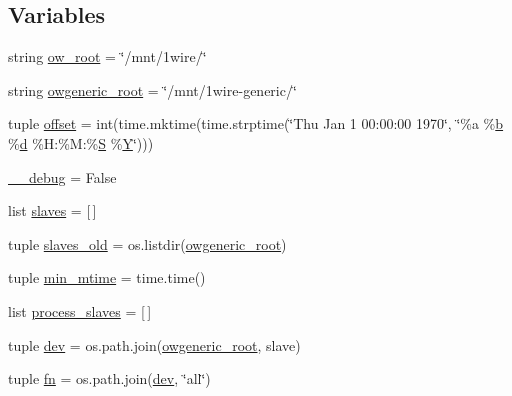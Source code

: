 \subsection*{Variables}
\begin{DoxyCompactItemize}
\item 
string \hyperlink{namespaceowgeneric__arduino_acf1b83c6bfca7dce8e079086078b19b9}{ow\-\_\-root} = \char`\"{}/mnt/1wire/\char`\"{}
\item 
string \hyperlink{namespaceowgeneric__arduino_a55174673236c57dac9b691a2f5b49b69}{owgeneric\-\_\-root} = \char`\"{}/mnt/1wire-\/generic/\char`\"{}
\item 
tuple \hyperlink{namespaceowgeneric__arduino_a30145d36e9de440b44c360e2c295e4aa}{offset} = int(time.\-mktime(time.\-strptime(\char`\"{}Thu Jan 1 00\-:00\-:00 1970\char`\"{}, \char`\"{}\%a \%\hyperlink{IMU_8cpp_a20f3a6e8a2ba2537edf801801628417b}{b} \%\hyperlink{OWGeneric__DangerShield_8ino_a22871ee78191bcd7676a38358795104e}{d} \%H\-:\%M\-:\%\hyperlink{md5_8c_a5a9675d71aad8449f8e4112ce611fd93}{S} \%\hyperlink{OWGeneric__SensorStation_8ino_ac915220fb659eb2c5958a1ccd81b80d4}{Y}\char`\"{})))
\item 
\hyperlink{namespaceowgeneric__arduino_abdc14696f564f9b8ed10fa1816940639}{\-\_\-\-\_\-debug} = False
\item 
list \hyperlink{namespaceowgeneric__arduino_a2c230abaed3d21deb7b84292cf219ed6}{slaves} = \mbox{[}$\,$\mbox{]}
\item 
tuple \hyperlink{namespaceowgeneric__arduino_a8185d7d521265a9dfca0cc8a8b75c718}{slaves\-\_\-old} = os.\-listdir(\hyperlink{namespaceowgeneric__arduino_a55174673236c57dac9b691a2f5b49b69}{owgeneric\-\_\-root})
\item 
tuple \hyperlink{namespaceowgeneric__arduino_ae35375aa69efe1f0333b7a86c6d4e8dd}{min\-\_\-mtime} = time.\-time()
\item 
list \hyperlink{namespaceowgeneric__arduino_a88e87453974fbe548a91bf0884be4ad3}{process\-\_\-slaves} = \mbox{[}$\,$\mbox{]}
\item 
tuple \hyperlink{namespaceowgeneric__arduino_a49246b75ead314904c32e0e686bb8248}{dev} = os.\-path.\-join(\hyperlink{namespaceowgeneric__arduino_a55174673236c57dac9b691a2f5b49b69}{owgeneric\-\_\-root}, slave)
\item 
tuple \hyperlink{namespaceowgeneric__arduino_a46bffb5615da79637d8d6cbebd45dcdc}{fn} = os.\-path.\-join(\hyperlink{namespaceowgeneric__arduino_a49246b75ead314904c32e0e686bb8248}{dev}, \char`\"{}all\char`\"{})
\item 

\end{DoxyCompactItemize}
